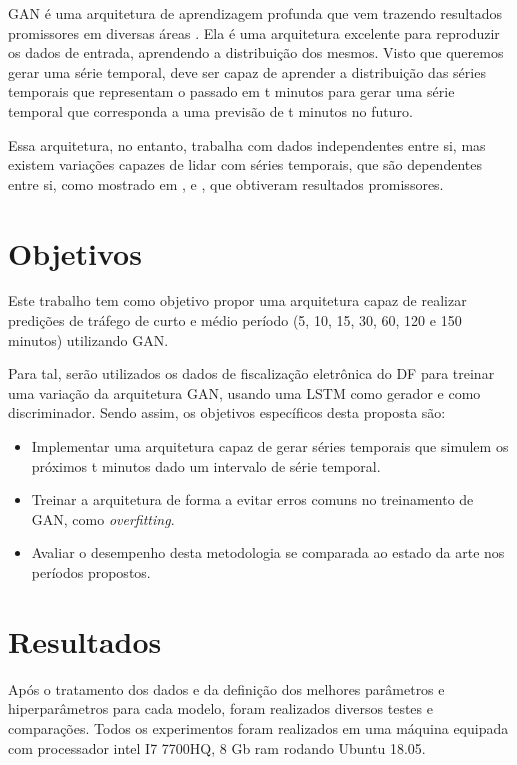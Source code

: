 \acrshort{GAN} é uma arquitetura de aprendizagem profunda que vem trazendo resultados promissores em diversas áreas \cite{christian}. Ela é uma arquitetura excelente para reproduzir os dados de entrada, aprendendo a distribuição dos mesmos. Visto que queremos gerar uma série temporal,  deve ser capaz de aprender a distribuição das séries temporais que representam o passado em t minutos para gerar uma série temporal que corresponda a uma previsão de t minutos no futuro.


Essa arquitetura, no entanto, trabalha com dados independentes entre si, mas existem variações capazes de lidar com séries temporais, que são dependentes entre si, como mostrado em \cite{zhou_2018}, \cite{banushev_2019} e \cite{esteban2017real}, que obtiveram resultados promissores.

\section{Objetivos}

Este trabalho tem como objetivo propor uma arquitetura capaz de realizar predições de tráfego de curto e médio período (5, 10, 15, 30, 60, 120 e 150 minutos) utilizando GAN.

Para tal, serão utilizados os dados de fiscalização eletrônica do \acrfull{DF} para treinar uma variação da arquitetura \acrshort{GAN}, usando uma \acrshort{LSTM} como gerador e como discriminador. Sendo assim, os objetivos específicos desta proposta são:

\begin{itemize}
    \item Implementar uma arquitetura capaz de gerar séries temporais que simulem os próximos t minutos dado um intervalo de série temporal.
    \item Treinar a arquitetura de forma a evitar erros comuns no treinamento de \acrshort{GAN}, como \textit{overfitting}.
    \item Avaliar o desempenho desta metodologia se comparada ao estado da arte nos períodos propostos.
\end{itemize}

\section{Resultados}



Após o tratamento dos dados e da definição dos melhores parâmetros e hiperparâmetros para cada modelo, foram realizados diversos testes e comparações. Todos os experimentos foram realizados em uma máquina equipada com processador intel I7 7700HQ, 8 Gb ram rodando Ubuntu 18.05.


